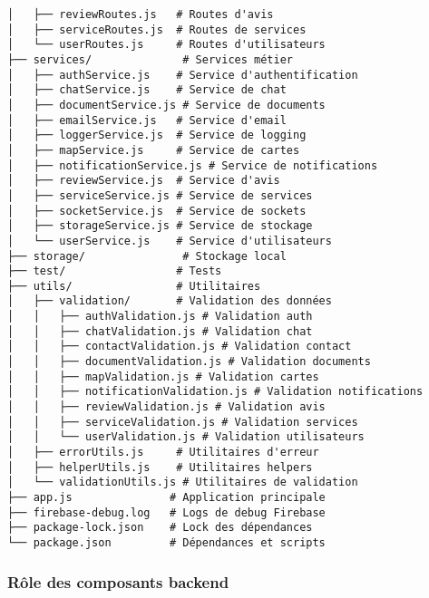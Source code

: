 \documentclass[12pt, a4paper]{article}
\begin{document}
\begin{lstlisting}
│   ├── reviewRoutes.js   # Routes d'avis
│   ├── serviceRoutes.js  # Routes de services
│   └── userRoutes.js     # Routes d'utilisateurs
├── services/              # Services métier
│   ├── authService.js    # Service d'authentification
│   ├── chatService.js    # Service de chat
│   ├── documentService.js # Service de documents
│   ├── emailService.js   # Service d'email
│   ├── loggerService.js  # Service de logging
│   ├── mapService.js     # Service de cartes
│   ├── notificationService.js # Service de notifications
│   ├── reviewService.js  # Service d'avis
│   ├── serviceService.js # Service de services
│   ├── socketService.js  # Service de sockets
│   ├── storageService.js # Service de stockage
│   └── userService.js    # Service d'utilisateurs
├── storage/               # Stockage local
├── test/                 # Tests
├── utils/                # Utilitaires
│   ├── validation/       # Validation des données
│   │   ├── authValidation.js # Validation auth
│   │   ├── chatValidation.js # Validation chat
│   │   ├── contactValidation.js # Validation contact
│   │   ├── documentValidation.js # Validation documents
│   │   ├── mapValidation.js # Validation cartes
│   │   ├── notificationValidation.js # Validation notifications
│   │   ├── reviewValidation.js # Validation avis
│   │   ├── serviceValidation.js # Validation services
│   │   └── userValidation.js # Validation utilisateurs
│   ├── errorUtils.js     # Utilitaires d'erreur
│   ├── helperUtils.js    # Utilitaires helpers
│   └── validationUtils.js # Utilitaires de validation
├── app.js               # Application principale
├── firebase-debug.log   # Logs de debug Firebase
├── package-lock.json    # Lock des dépendances
└── package.json         # Dépendances et scripts
\end{lstlisting}

\subsubsection{Rôle des composants backend}
\end{document}
